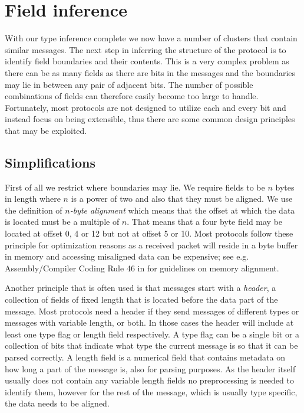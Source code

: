 \documentclass[a4paper]{report}
\begin{document}
\section{Field inference}
\label{sec:field_inf}
With our type inference complete we now have a number of clusters that contain
similar messages. The next step in inferring the structure of the protocol is
to identify field boundaries and their contents. This is a very complex
problem as there can be as many fields as there are bits in the messages and
the boundaries may lie in between any pair of adjacent bits. The number of
possible combinations of fields can therefore easily become too large to
handle. Fortunately, most protocols are not designed to utilize each and every
bit and instead focus on being extensible, thus there are some common design
principles that may be exploited.

\subsection{Simplifications}
\label{sec:simplifications}
First of all we restrict where boundaries may lie. We require fields to be $n$
bytes in length where $n$ is a power of two and also that they must be aligned.
We use the definition of \emph{$n$-byte alignment} which means that the offset
at which the data is located must be a multiple of $n$. That means that a four
byte field may be located at offset 0, 4 or 12 but not at offset 5 or 10. Most
protocols follow these principle for optimization reasons as a received packet
will reside in a byte buffer in memory and accessing misaligned data can be
expensive; see e.g. Assembly/Compiler Coding Rule 46 in 
for guidelines on memory alignment.

Another principle that is often used is that messages start with a
\emph{header}, a collection of fields of fixed length that is located before
the data part of the message. Most protocols need a header if they send
messages of different types or messages with variable length, or both. In those
cases the header will include at least one type flag or length field
respectively. A type flag can be a single bit or a collection of bits that
indicate what type the current message is so that it can be parsed correctly. A
length field is a numerical field that contains metadata on how long a part of
the message is, also for parsing purposes. As the header itself usually does
not contain any variable length fields no preprocessing is needed to identify
them, however for the rest of the message, which is usually type specific, the
data needs to be aligned.
\end{document}
